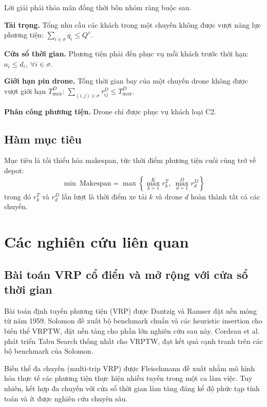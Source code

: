 \documentclass[../DoAn.tex]{subfiles}
\begin{document}
Lời giải phải thỏa mãn đồng thời bốn nhóm ràng buộc sau.

\textbf{Tải trọng.} Tổng nhu cầu các khách trong một chuyến không được vượt năng lực phương tiện: $\sum_{i \in \sigma} q_i \leq Q^v$.

\textbf{Cửa sổ thời gian.} Phương tiện phải đến phục vụ mỗi khách trước thời hạn: $a_i \leq d_i,\ \forall i \in \sigma$.

\textbf{Giới hạn pin drone.} Tổng thời gian bay của một chuyến drone không được vượt giới hạn $T^D_{\max}$: $\sum_{(i,j) \in \sigma} \tau^D_{ij} \leq T^D_{\max}$.

\textbf{Phân công phương tiện.} Drone chỉ được phục vụ khách loại C2.

\subsection{Hàm mục tiêu}

Mục tiêu là tối thiểu hóa makespan, tức thời điểm phương tiện cuối cùng trở về depot:
\[
\min\ \text{Makespan} = \max\!\left\{\max_{k=1}^{K} r_k^T,\ \max_{d=1}^{D} r_d^D\right\}
\]
trong đó $r_k^T$ và $r_d^D$ lần lượt là thời điểm xe tải $k$ và drone $d$ hoàn thành tất cả các chuyến.

\section{Các nghiên cứu liên quan}
\label{sec:relatedwork}

\subsection{Bài toán VRP cổ điển và mở rộng với cửa sổ thời gian}

Bài toán định tuyến phương tiện (VRP) được Dantzig và Ramser đặt nền móng từ năm 1959. Solomon đề xuất bộ benchmark chuẩn và các heuristic insertion cho biến thể VRPTW, đặt nền tảng cho phần lớn nghiên cứu sau này. Cordeau et al. phát triển Tabu Search thống nhất cho VRPTW, đạt kết quả cạnh tranh trên các bộ benchmark của Solomon.

Biến thể đa chuyến (multi-trip VRP) được Fleischmann đề xuất nhằm mô hình hóa thực tế các phương tiện thực hiện nhiều tuyến trong một ca làm việc. Tuy nhiên, kết hợp đa chuyến với cửa sổ thời gian làm tăng đáng kể độ phức tạp tính toán và ít được nghiên cứu chuyên sâu.
\end{document}
